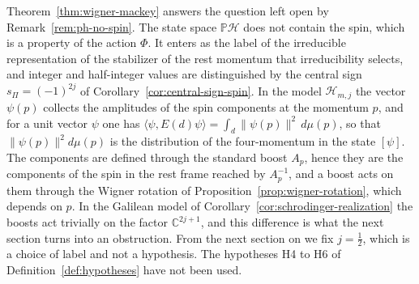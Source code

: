 \begin{remark}\label{rem:spin-emerges}
	Theorem~\ref{thm:wigner-mackey} answers the question left open by Remark~\ref{rem:ph-no-spin}. The state space $\mathbb{P}\mathcal{H}$ does not contain the spin, which is a property of the action $\Phi$. It enters as the label of the irreducible representation of the stabilizer of the rest momentum that irreducibility selects, and integer and half-integer values are distinguished by the central sign $s_\Pi=(-1)^{2j}$ of Corollary~\ref{cor:central-sign-spin}. In the model $\mathcal{H}_{m,j}$ the vector $\psi(p)$ collects the amplitudes of the spin components at the momentum $p$, and for a unit vector $\psi$ one has $\langle\psi,E(d)\psi\rangle=\int_d\|\psi(p)\|^2\,d\mu(p)$, so that $\|\psi(p)\|^2d\mu(p)$ is the distribution of the four-momentum in the state $[\psi]$. The components are defined through the standard boost $A_p$, hence they are the components of the spin in the rest frame reached by $A_p^{-1}$, and a boost acts on them through the Wigner rotation of Proposition~\ref{prop:wigner-rotation}, which depends on $p$. In the Galilean model of Corollary~\ref{cor:schrodinger-realization} the boosts act trivially on the factor $\mathbb{C}^{2j+1}$, and this difference is what the next section turns into an obstruction. From the next section on we fix $j=\tfrac12$, which is a choice of label and not a hypothesis. The hypotheses H4 to H6 of Definition~\ref{def:hypotheses} have not been used.
\end{remark}

